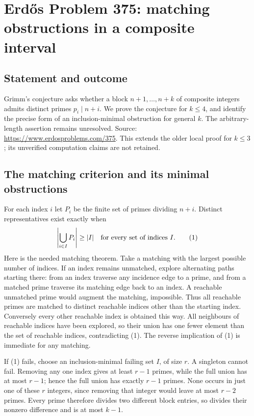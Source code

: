 \section*{Erd\H{o}s Problem 375: matching obstructions in a composite interval}
\subsection*{Statement and outcome}
Grimm's conjecture asks whether a block $n+1,\ldots,n+k$ of composite integers admits distinct primes $p_i\mid n+i$. We prove the conjecture for $k\le4$, and identify the precise form of an inclusion-minimal obstruction for general $k$. The arbitrary-length assertion remains unresolved. Source: \url{https://www.erdosproblems.com/375}. This extends the older local proof for $k\le3$; its unverified computation claims are not retained.

\subsection*{The matching criterion and its minimal obstructions}
For each index $i$ let $P_i$ be the finite set of primes dividing $n+i$. Distinct representatives exist exactly when
\[
 \left|\bigcup_{i\in I}P_i\right|\ge |I|\quad\hbox{for every set of indices }I. \tag{1}
\]
Here is the needed matching theorem. Take a matching with the largest possible number of indices. If an index remains unmatched, explore alternating paths starting there: from an index traverse any incidence edge to a prime, and from a matched prime traverse its matching edge back to an index. A reachable unmatched prime would augment the matching, impossible. Thus all reachable primes are matched to distinct reachable indices other than the starting index. Conversely every other reachable index is obtained this way. All neighbours of reachable indices have been explored, so their union has one fewer element than the set of reachable indices, contradicting (1). The reverse implication of (1) is immediate for any matching.

If (1) fails, choose an inclusion-minimal failing set $I$, of size $r$. A singleton cannot fail. Removing any one index gives at least $r-1$ primes, while the full union has at most $r-1$; hence the full union has exactly $r-1$ primes. None occurs in just one of these $r$ integers, since removing that integer would leave at most $r-2$ primes. Every prime therefore divides two different block entries, so divides their nonzero difference and is at most $k-1$.

